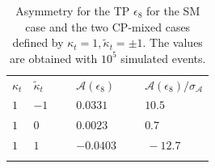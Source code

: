 \documentclass[aps,preprint,tightenlines,floatfix,superscriptaddress,nofootinbib,showpacs]{revtex4-1}
\def\kp{\kappa_t}
\def\kpt{\tilde{\kappa}_t}
\begin{document}
\begin{table}[H]
\caption{Asymmetry for the TP $\epsilon_{8}$ for the SM case and the
  two $\mathrm{CP}$-mixed cases defined by $\kp=1,\kpt=\pm 1$. The
  values are obtained with $10^5$ simulated events.}
\label{table8}
\begin{center}
\begin{tabular}{|C{1cm}|C{1cm}||C{2cm}|C{2cm}|}
\hhline{|====|}
$\kappa_t$&$\tilde{\kappa}_t$~~&$\mathcal{A}(\epsilon_8)$~~&$\mathcal{A}(\epsilon_8)/\sigma_{\mathcal{A}}$ \\ 
\hhline{|====|} 
$1$ & $-1$~~~ & $0.0331$~ & $10.5$~ \\[0.6mm]
\hline
$1$ & $0$ & $0.0023$~ & $0.7$~ \\[0.6mm]
\hline
$1$ & $1$ & $-0.0403$~~~ & $\,-12.7$~~~~ \\[0.6mm]
\hhline{|====|}
\end{tabular}
\end{center} 
\end{table}
\end{document}
